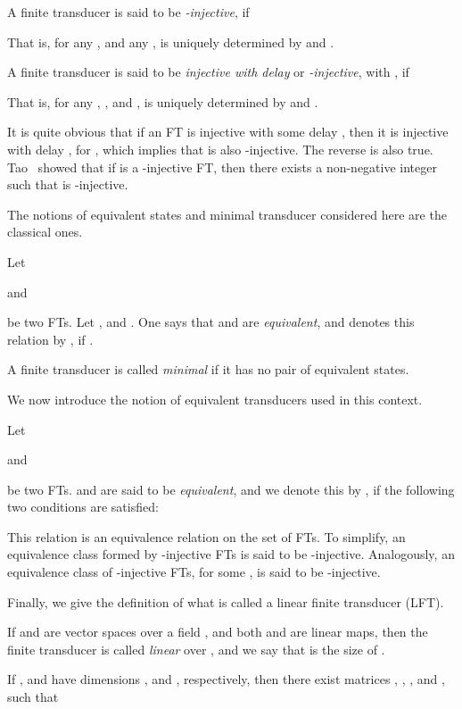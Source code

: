 \documentclass{ocg}
\newcommand{\FT}{FT}
\newcommand{\LFT}{LFT}
\begin{document}
\begin{definition}
  A finite transducer  is said to be \emph{-injective}, if

That is, for any , and any ,
   is uniquely determined by  and .
\end{definition}
\begin{definition}
  A finite transducer  is said to be \emph{injective with
    delay } or \emph{-injective}, with , if

That is, for any , , and ,  is uniquely determined by  and
  .
\end{definition}

It is quite obvious that if an FT{} is injective with some delay
, then it is injective with delay , for
, which implies that is also -injective. The
reverse is also true. Tao~\cite[Corollary 1.4.3]{TaoBook} showed that
if  is a -injective \FT, then there exists a
non-negative integer  such that  is
-injective.

The notions of equivalent states and minimal transducer considered
here are the classical ones.

\begin{definition}
  Let
  
  and
  
  be two \FT{}s. Let , and . One says that
   and  are \emph{equivalent}, and denotes this relation by
  , if .
\end{definition}
\begin{definition}
  A finite transducer  is called \emph{minimal} if it has no
  pair of equivalent states.
\end{definition}
We now introduce the notion of equivalent transducers used in this
context.
\begin{definition}
  Let
  
  and
  
  be two \FT{}s.  and  are said to be \emph{equivalent}, and
  we denote this by , if the following two conditions are
  satisfied:
   
\end{definition}
This relation  is an equivalence relation on the set of
\FT{}s. To simplify, an equivalence class formed by
-injective \FT{}s is said to be
-injective. Analogously, an equivalence class of
-injective \FT{}s, for some , is said to be
-injective.

Finally, we give the definition of what is called a linear finite transducer (\LFT{}).

\begin{definition}
  If  and  are vector spaces over a field
  , and both  and  are linear maps, then the finite
  transducer  is called \emph{linear} over , and
  we say that  is the size of .
\end{definition}
If , and  have dimensions ,  and
, respectively, then there exist matrices , , , and , such that
\end{document}
